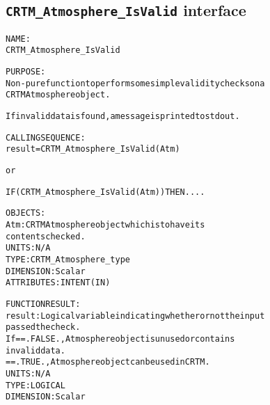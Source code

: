 \subsection{\texttt{CRTM\_Atmosphere\_IsValid} interface}
  \label{sec:CRTM_Atmosphere_IsValid_interface}
  \begin{alltt}
 
  NAME:
        CRTM_Atmosphere_IsValid
 
  PURPOSE:
        Non-pure function to perform some simple validity checks on a
        CRTM Atmosphere object. 
 
        If invalid data is found, a message is printed to stdout.
 
  CALLING SEQUENCE:
        result = CRTM_Atmosphere_IsValid( Atm )
 
          or
 
        IF ( CRTM_Atmosphere_IsValid( Atm ) ) THEN....
 
  OBJECTS:
        Atm:       CRTM Atmosphere object which is to have its
                   contents checked.
                   UNITS:      N/A
                   TYPE:       CRTM_Atmosphere_type
                   DIMENSION:  Scalar
                   ATTRIBUTES: INTENT(IN)
 
  FUNCTION RESULT:
        result:    Logical variable indicating whether or not the input
                   passed the check.
                   If == .FALSE., Atmosphere object is unused or contains
                                  invalid data.
                      == .TRUE.,  Atmosphere object can be used in CRTM.
                   UNITS:      N/A
                   TYPE:       LOGICAL
                   DIMENSION:  Scalar
 
  \end{alltt}
